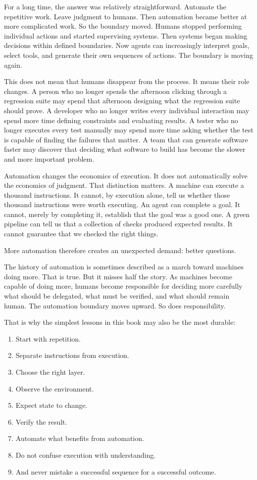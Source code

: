 \documentclass[11pt,twoside]{book}
\begin{document}
For a long time, the answer was relatively straightforward.
Automate the repetitive work.
Leave judgment to humans.
Then automation became better at more complicated work.
So the boundary moved.
Humans stopped performing individual actions and started supervising systems.
Then systems began making decisions within defined boundaries.
Now agents can increasingly interpret goals, select tools, and generate their own sequences of actions.
The boundary is moving again.

This does not mean that humans disappear from the process.
It means their role changes.
A person who no longer spends the afternoon clicking through a regression suite may spend that afternoon designing what the regression suite should prove.
A developer who no longer writes every individual interaction may spend more time defining constraints and evaluating results.
A tester who no longer executes every test manually may spend more time asking whether the test is capable of finding the failures that matter.
A team that can generate software faster may discover that deciding what software to build has become the slower and more important problem.

Automation changes the economics of execution.
It does not automatically solve the economics of judgment.
That distinction matters.
A machine can execute a thousand instructions.
It cannot, by execution alone, tell us whether those thousand instructions were worth executing.
An agent can complete a goal.
It cannot, merely by completing it, establish that the goal was a good one.
A green pipeline can tell us that a collection of checks produced expected results.
It cannot guarantee that we checked the right things.

More automation therefore creates an unexpected demand:
better questions.

The history of automation is sometimes described as a march toward machines doing more.
That is true.
But it misses half the story.
As machines become capable of doing more, humans become responsible for deciding more carefully what should be delegated, what must be verified, and what should remain human.
The automation boundary moves upward.
So does responsibility.

That is why the simplest lessons in this book may also be the most durable:
\begin{enumerate}[nosep]
    \item Start with repetition.
    \item Separate instructions from execution.
    \item Choose the right layer.
    \item Observe the environment.
    \item Expect state to change.
    \item Verify the result.
    \item Automate what benefits from automation.
    \item Do not confuse execution with understanding.
    \item And never mistake a successful sequence for a successful outcome.
\end{enumerate}
\end{document}

